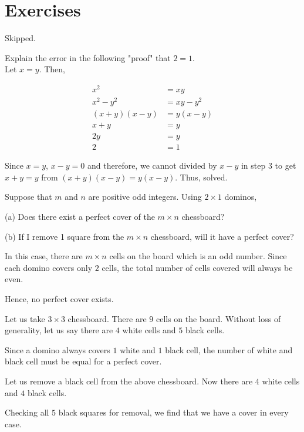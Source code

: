 \section*{Exercises}

\begin{problem}Skipped.\end{problem}

\begin{problem}
  Explain the error in the following "proof" that $2 = 1$. \\
  Let $x = y$. Then,

\begin{align}
x^2 &= xy \\
x^2 - y^2 &= xy - y^2 \\
(x+y)(x-y) &= y(x-y) \\
x+y &= y \\
2y &= y \\
2 &= 1
\end{align}
\end{problem}

\begin{solution}
  Since $x = y$, $x-y = 0$ and therefore, we cannot divided by $x-y$ in step $3$ to get $x+y = y$ from $(x+y)(x-y) = y(x-y)$. Thus, solved.
\end{solution}


\begin{problem}
  Suppose that $m$ and $n$ are positive odd integers. Using $2 \times 1$ dominos,

  (a) Does there exist a perfect cover of the $m \times n$ chessboard?

  (b) If I remove 1 square from the $m \times n$ chessboard, will it have a perfect cover?
\end{problem}

\begin{solution}[a]
  In this case, there are $m \times n$ cells on the board which is an odd number. Since each domino covers only $2$ cells, the total number of cells covered will always be even.

  Hence, no perfect cover exists.
\end{solution}

\begin{scratch}[b]
  Let us take $3 \times 3$ chessboard. There are $9$ cells on the board. Without loss of generality, let us say there are $4$ white cells and $5$ black cells.

  Since a domino always covers $1$ white and $1$ black cell, the number of white and black cell must be equal for a perfect cover.

  Let us remove a black cell from the above chessboard. Now there are $4$ white cells and $4$ black cells.

  Checking all $5$ black squares for removal, we find that we have a cover in every case.
\end{scratch}

